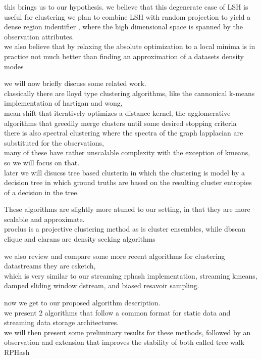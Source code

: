 \documentclass{beamer}
\begin{document}
\begin{frame}[plain]
this brings us to our hypothesis.
we believe that this degenerate case of LSH is useful for clustering
we plan to combine LSH with random projection to yield a dense region indentifier
, where the high dimensional space is spanned by the observation attributes.\\
we also believe that by relaxing the absolute optimization to a local minima
is in practice not much better than finding an approximation of a datasets density
modes
\end{frame}

\begin{frame}[plain]
we will now briefly discuss some related work.\\
classically there are lloyd type clustering algorithms, like the cannonical k-means
implementation of hartigan and wong,\\
mean shift that iteratively optimizes a distance kernel,
the agglomerative algorithms that greedily merge clusters until some desired stopping
criteria\\
there is also spectral clustering where the spectra of the graph lapplacian are
substituted for the observations,\\
many of these have rather unscalable complexity with the exception of kmeans, so we
will focus on that.\\
later we will disucss tree based clusterin in which the clustering is model by
a decision tree in which ground truths are based on the resulting cluster entropies
of a decision in the tree.
\end{frame}

\begin{frame}[plain]
These algorithms are slightly more atuned to our setting, in that they are more
scalable and approximate.\\
proclus is a projective clustering method as is cluster ensembles, while
dbscan clique and clarans are density seeking algorithms
\end{frame}

\begin{frame}[plain]
we also review and compare some more recent algorithms for clustering datastreams
they are csketch, \\
which is very similar to our streaming rphash implementation,
streaming kmeans, damped sliding window dstream, and biased resavoir sampling.
\end{frame}

\begin{frame}[plain]
now we get to our proposed algorithm description.\\
we present 2 algorithms that follow a common format for static data and streaming
data storage architectures.\\
we will then present some preliminary results for these
methods, followed by an observation and extension that improves the stability of both
called tree walk RPHash
\end{frame}
\end{document}
